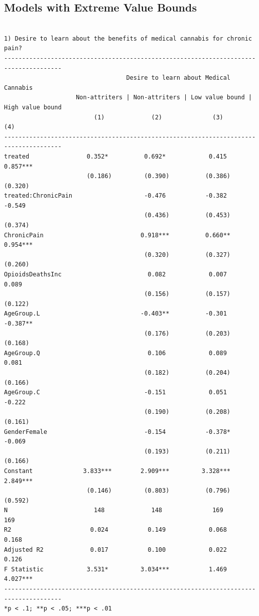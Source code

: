 \documentclass[
]{article}
\begin{document}
\pagebreak

\hypertarget{models-with-extreme-value-bounds}{%
\subsection{Models with Extreme Value
Bounds}\label{models-with-extreme-value-bounds}}

\begin{verbatim}

1) Desire to learn about the benefits of medical cannabis for chronic pain?
--------------------------------------------------------------------------------------
                                  Desire to learn about Medical Cannabis              
                    Non-attriters | Non-attriters | Low value bound | High value bound
                         (1)             (2)              (3)              (4)        
--------------------------------------------------------------------------------------
treated                0.352*          0.692*            0.415           0.857***     
                       (0.186)         (0.390)          (0.386)          (0.320)      
treated:ChronicPain                    -0.476           -0.382            -0.549      
                                       (0.436)          (0.453)          (0.374)      
ChronicPain                           0.918***          0.660**          0.954***     
                                       (0.320)          (0.327)          (0.260)      
OpioidsDeathsInc                        0.082            0.007            0.089       
                                       (0.156)          (0.157)          (0.122)      
AgeGroup.L                            -0.403**          -0.301           -0.387**     
                                       (0.176)          (0.203)          (0.168)      
AgeGroup.Q                              0.106            0.089            0.081       
                                       (0.182)          (0.204)          (0.166)      
AgeGroup.C                             -0.151            0.051            -0.222      
                                       (0.190)          (0.208)          (0.161)      
GenderFemale                           -0.154           -0.378*           -0.069      
                                       (0.193)          (0.211)          (0.166)      
Constant              3.833***        2.909***         3.328***          2.849***     
                       (0.146)         (0.803)          (0.796)          (0.592)      
N                        148             148              169              169        
R2                      0.024           0.149            0.068            0.168       
Adjusted R2             0.017           0.100            0.022            0.126       
F Statistic            3.531*         3.034***           1.469           4.027***     
--------------------------------------------------------------------------------------
*p < .1; **p < .05; ***p < .01                                                        
\end{verbatim}
\end{document}

